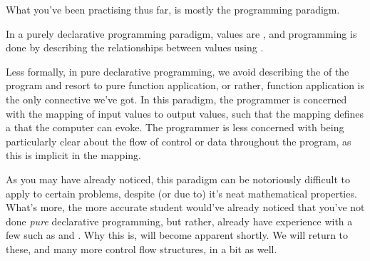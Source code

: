 What you've been practising thus far, is mostly the 
programming paradigm.

\begin{definition}

In a purely declarative programming paradigm, values are , and
programming is done by describing the relationships between values using
.

\end{definition}

Less formally, in pure declarative programming, we avoid describing the
 of the program and resort to pure function application, or rather,
function application is the only connective we've got.  In this paradigm, the
programmer is concerned with the mapping of input values to output values, such
that the mapping defines a  that the computer can
evoke.  The programmer is less concerned with being particularly clear about
the flow of control or data throughout the program, as this is implicit in the
mapping.

As you may have already noticed, this paradigm can be notoriously difficult to
apply to certain problems, despite (or due to) it's neat mathematical
properties.  What's more, the more accurate student would've already noticed
that you've not done \emph{pure} declarative programming, but rather, already
have experience with a few  such as  and
 .  Why this is, will become
apparent shortly. We will return to these, and many more control flow
structures, in a bit as well.
